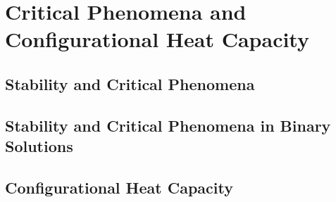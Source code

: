 \chapter{Critical Phenomena and Configurational Heat Capacity}
\section{Stability and Critical Phenomena}
\section{Stability and Critical Phenomena in Binary Solutions}
\section{Configurational Heat Capacity}